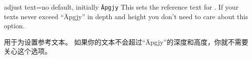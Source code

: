 





\begin{docTcbKey}{adjust text}{=}{no default, initially \texttt{\"Apgjy}}
This sets the reference text for . If your texts
never exceed \enquote{\"Apgjy} in depth and height you don't need to care about this option.

用于为设置参考文本。%
如果你的文本不会超过\enquote{\"Apgjy}的深度和高度，你就不需要关心这个选项。


\end{docTcbKey}


